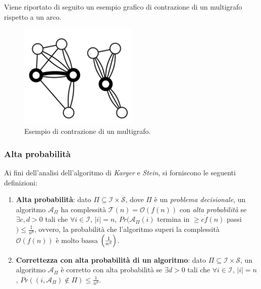 Viene riportato di seguito un esempio grafico di contrazione di un multigrafo rispetto a un arco.

\begin{figure}[H]
	\centering
	\includegraphics[width=0.5\textwidth]{res/images/multigraph}
	\caption{Esempio di contrazione di un multigrafo.}
	\label{fig:multigraph_contraction}
\end{figure}

\subsubsection*{Alta probabilità}

Ai fini dell'analisi dell'algoritmo di \textit{Karger} e \textit{Stein}, si forniscono le seguenti definizioni:
\begin{enumerate}
    \item \textbf{Alta probabilità}: dato $\Pi \subseteq \mathcal{I} \times \mathcal{S}$, dove $\Pi$ è un 
    \textit{problema decisionale}, un algoritmo $\mathcal{A}_{\Pi}$ ha complessità 
    $\mathcal{T}(n) = \mathcal{O}(f(n))$ con \textit{alta probabilità} se $\exists c, d > 0$ tali che 
    $\forall i \in \mathcal{I}$, $|i| = n$, $Pr(\mathcal{A}_{\Pi}(i)$ termina in $\ge c \dot f(n)$ passi $) \le \frac{1}{n^d}$, 
    ovvero, la probabilità che l'algoritmo superi la complessità $\mathcal{O}(f(n))$ è molto bassa $\Bigl(\frac{1}{n^d}\Bigr)$.
    \item \textbf{Correttezza con alta probabilità di un algoritmo}: dato $\Pi \subseteq \mathcal{I} \times \mathcal{S}$, 
    un algoritmo $\mathcal{A}_{\Pi}$ è corretto con alta probabilità se $\exists d > 0$ tali che 
    $\forall i \in \mathcal{I}$, $|i| = n$, $Pr((i, \mathcal{A}_{\Pi}) \notin \Pi) \le \frac{1}{n^d}$.
\end{enumerate}

